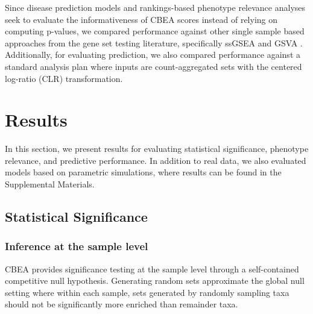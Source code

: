 \documentclass[10pt,letterpaper]{article}
\begin{document}
Since disease prediction models and rankings-based phenotype relevance analyses seek to evaluate the informativeness of CBEA scores instead of relying on computing p-values, we compared performance against other single sample based approaches from the gene set testing literature, specifically ssGSEA \cite{barbie2009} and GSVA \cite{hanzelmann2013}. Additionally, for evaluating prediction, we also compared performance against a standard analysis plan where inputs are count-aggregated sets with the centered log-ratio (CLR) transformation. 

\section*{Results}
In this section, we present results for evaluating statistical significance, phenotype relevance, and predictive performance. In addition to real data, we also evaluated models based on parametric simulations, where results can be found in the Supplemental Materials.   

\subsection*{Statistical Significance}
\subsubsection*{Inference at the sample level}
CBEA provides significance testing at the sample level through a self-contained competitive null hypothesis. Generating random sets approximate the global null setting where within each sample, sets generated by randomly sampling taxa should not be significantly more enriched than remainder taxa.   
\end{document}
